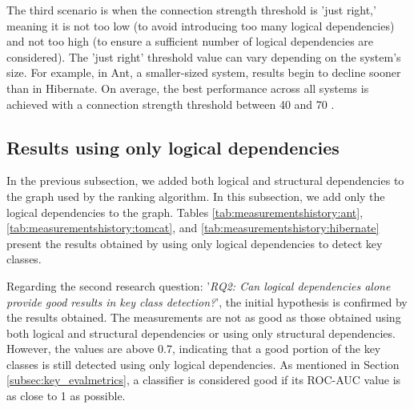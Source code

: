 The third scenario is when the connection strength threshold is 'just right,' meaning it is not too low (to avoid introducing too many logical dependencies) and not too high (to ensure a sufficient number of logical dependencies are considered). The 'just right' threshold value can vary depending on the system's size. For example, in Ant, a smaller-sized system, results begin to decline sooner than in Hibernate. On average, the best performance across all systems is achieved with a connection strength threshold between 40 and 70 \cite{b4}.





\subsection{Results using only logical dependencies}
\label{subsec:key_results_ld}

\hspace{4em}In the previous subsection, we added both logical and structural dependencies to the graph used by the ranking algorithm. In this subsection, we add only the logical dependencies to the graph. Tables \ref{tab:measurementshistory:ant}, \ref{tab:measurementshistory:tomcat}, and \ref{tab:measurementshistory:hibernate} present the results obtained by using only logical dependencies to detect key classes.

Regarding the second research question: '\textit{RQ2: Can logical dependencies alone provide good results in key class detection?}', the initial hypothesis is confirmed by the results obtained. The measurements are not as good as those obtained using both logical and structural dependencies or using only structural dependencies. However, the values are above 0.7, indicating that a good portion of the key classes is still detected using only logical dependencies. As mentioned in Section \ref{subsec:key_evalmetrics}, a classifier is considered good if its ROC-AUC value is as close to 1 as possible.



